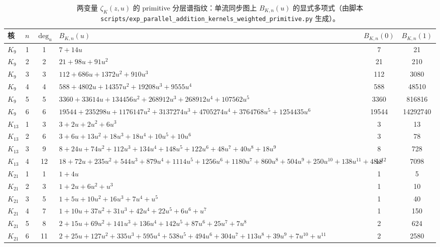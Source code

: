 \begin{table}[H]
\centering
\scriptsize
\setlength{\tabcolsep}{6pt}
\renewcommand{\arraystretch}{1.15}
\caption{两变量 $\zeta_K(z,u)$ 的 primitive 分层谱指纹：单流同步图上 $B_{K,n}(u)$ 的显式多项式（由脚本 \texttt{scripts/exp\_parallel\_addition\_kernels\_weighted\_primitive.py} 生成）。}
\label{tab:parallel-addition-kernels-weighted-primitive}
\begin{tabular}{@{}lccp{}cc@{}}
\toprule
核 & $n$ & $\deg_u$ & $B_{K,n}(u)$ & $B_{K,n}(0)$ & $B_{K,n}(1)$ \\
\midrule
$K_{9}$ & 1 & 1 & $7+14u$ & 7 & 21 \\
$K_{9}$ & 2 & 2 & $21+98u+91u^{2}$ & 21 & 210 \\
$K_{9}$ & 3 & 3 & $112+686u+1372u^{2}+910u^{3}$ & 112 & 3080 \\
$K_{9}$ & 4 & 4 & $588+4802u+14357u^{2}+19208u^{3}+9555u^{4}$ & 588 & 48510 \\
$K_{9}$ & 5 & 5 & $3360+33614u+134456u^{2}+268912u^{3}+268912u^{4}+107562u^{5}$ & 3360 & 816816 \\
$K_{9}$ & 6 & 6 & $19544+235298u+1176147u^{2}+3137274u^{3}+4705274u^{4}+3764768u^{5}+1254435u^{6}$ & 19544 & 14292740 \\
$K_{13}$ & 1 & 3 & $3+2u+2u^{2}+6u^{3}$ & 3 & 13 \\
$K_{13}$ & 2 & 6 & $3+6u+13u^{2}+18u^{3}+18u^{4}+10u^{5}+10u^{6}$ & 3 & 78 \\
$K_{13}$ & 3 & 9 & $8+24u+74u^{2}+112u^{3}+134u^{4}+148u^{5}+122u^{6}+48u^{7}+40u^{8}+18u^{9}$ & 8 & 728 \\
$K_{13}$ & 4 & 12 & $18+72u+235u^{2}+544u^{3}+879u^{4}+1114u^{5}+1256u^{6}+1180u^{7}+860u^{8}+504u^{9}+250u^{10}+138u^{11}+48u^{12}$ & 18 & 7098 \\
$K_{21}$ & 1 & 1 & $1+4u$ & 1 & 5 \\
$K_{21}$ & 2 & 3 & $1+2u+6u^{2}+u^{3}$ & 1 & 10 \\
$K_{21}$ & 3 & 5 & $1+5u+10u^{2}+16u^{3}+7u^{4}+u^{5}$ & 1 & 40 \\
$K_{21}$ & 4 & 7 & $1+10u+37u^{2}+31u^{3}+42u^{4}+22u^{5}+6u^{6}+u^{7}$ & 1 & 150 \\
$K_{21}$ & 5 & 8 & $2+15u+69u^{2}+141u^{3}+136u^{4}+142u^{5}+87u^{6}+25u^{7}+7u^{8}$ & 2 & 624 \\
$K_{21}$ & 6 & 11 & $2+25u+127u^{2}+335u^{3}+595u^{4}+538u^{5}+494u^{6}+304u^{7}+113u^{8}+39u^{9}+7u^{10}+u^{11}$ & 2 & 2580 \\
\bottomrule
\end{tabular}
\end{table}
